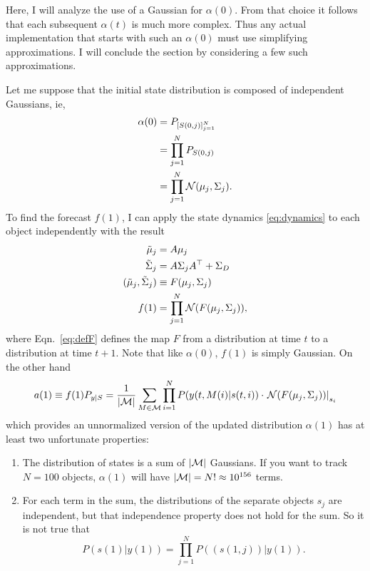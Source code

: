 \documentclass[11pt]{article}
\newcommand{\normal}[2]{{\cal N}(#1,#2)}
\newcommand{\M}{{\cal M}}
\newcommand{\transpose}{^\top}
\newcommand{\os}[4]{{\left[ #1(#2) \right]}_{#3}^{#4}} %
\newcommand{\ti}[2]{{#1}{(#2)}}                         %
\begin{document}
Here, I will analyze the use of a Gaussian for $\alpha(0)$.  From that
choice it follows that each subsequent $\ti{\alpha}{t}$ is much more
complex.  Thus any actual implementation that starts with such an
$\alpha(0)$ must use simplifying approximations.  I will conclude the
section by considering a few such approximations.

Let me suppose that the initial state distribution is composed of
independent Gaussians, ie,
\begin{align*}
  \ti{\alpha}{0} &= P_{\os{S}{0,j}{j=1}{N} }\\
  &= \prod_{j=1}^{N} P_{\ti{S}{0,j}} \\
  &= \prod_{j=1}^{N} \normal{\mu_j}{\Sigma_j}.
\end{align*}
To find the forecast $\ti{f}{1}$, I can apply the state dynamics
\eqref{eq:dynamics} to each object independently with the result
\begin{align}
  \tilde \mu_j &= A \mu_j \\
  \tilde \Sigma_j &= A \Sigma_j A\transpose + \Sigma_D \\
  \label{eq:defF}
  (\tilde \mu_j, \tilde \Sigma_j ) &\equiv F(\mu_j,\Sigma_j) \\
  \label{eq:f1}
  \ti{f}{1} &= \prod_{j=1}^{N} {\cal N}(F(\mu_j,\Sigma_j)),
\end{align}
where Eqn.~\eqref{eq:defF} defines the map $F$ from a distribution at
time $t$ to a distribution at time $t+1$.  Note that like
$\ti{\alpha}{0}$, $\ti{f}{1}$ is simply Gaussian.  On the other hand
\begin{equation}
  \label{eq:a1}
  a(1) \equiv f(1) P_{y|S} = \frac{1}{\left| \M \right|} \sum_{M \in \M}
  \prod_{i=1}^N P(y(t,M(i)|s(t,i)) \cdot \left. {\cal
      N}(F(\mu_j,\Sigma_j))\right|_{s_i}
\end{equation}
which provides an unnormalized version of the updated distribution
$\alpha(1)$ has at least two unfortunate properties:
\begin{enumerate}
\item The distribution of states is a sum of $\left| \M \right|$
  Gaussians.  If you want to track $N=100$ objects, $\alpha(1)$ will
  have $\left| \M \right| = N! \approx 10^{156}$ terms.
\item For each term in the sum, the distributions of the separate
  objects $s_j$ are independent, but that independence property does
  not hold for the sum.  So it is not true that
  \begin{equation*}
    P(s(1)|y(1)) = \prod_{j=1}^N  P\left( \left( s(1,j) \right)|y(1)
    \right).
  \end{equation*}
\end{enumerate}
\end{document}
